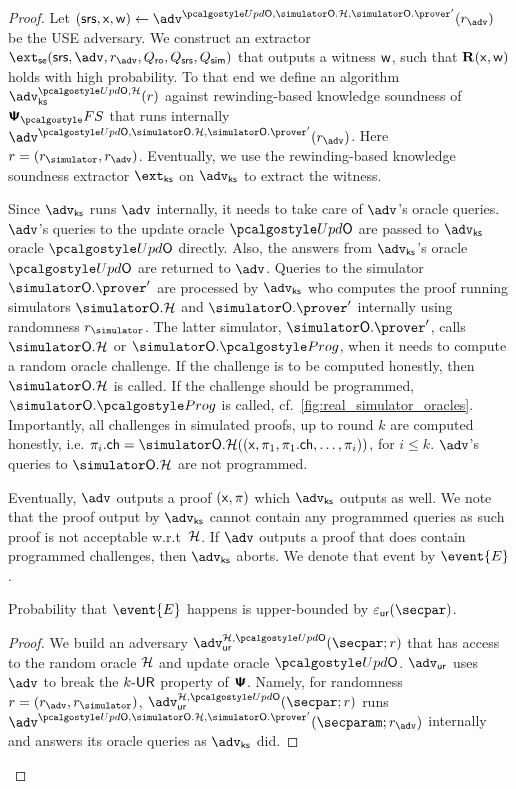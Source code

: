 \begin{proof}	
	Let $(\srs, \inp, \wit) \gets \advse^{\initU, \simOH, \simOP'}(r_{\advse})$ be the USE adversary. We construct an extractor $\extse (\srs, \advse, r_{\advse}, \Qro, \Qsrs, \Qsim)$ that outputs a witness $\mathsf{w}$, such that $\mathbf{R}(\mathsf{x}, \mathsf{w})$ holds with high probability. To that end we define an algorithm $\advcss^{\initU,\ro}(r)$ against rewinding-based knowledge soundness of $\psfs$ that runs internally $\advse^{\initU, \simOH, \simOP'}(r_{\advse})$. Here $r = (\rsim, r_{\advse})$. Eventually, we use the rewinding-based knowledge soundness extractor $\extcss$ on $\advcss$ to extract the witness.
	
	Since $\advcss$ runs $\advse$ internally, it needs to take care of $\advse$'s oracle queries.
	$\advse$'s queries to the update oracle $\initU$ are passed to $\advcss$ oracle $\initU$ directly. Also, the answers from $\advcss$'s oracle $\initU$ are returned to $\advse$.
	Queries to the simulator $\simOP'$ are processed by $\advcss$ who computes the proof running simulators $\simOH$ and $\simOP'$ internally using randomness $\rsim$. The latter simulator, $\simOP'$, calls $\simOH$ or $\simOHprog$, when it needs to compute a random oracle challenge. If the challenge is to be computed honestly, then $\simOH$ is called. If the challenge should be programmed, $\simOHprog$ is called, cf.~\cref{fig:real_simulator_oracles}. Importantly, all challenges in simulated proofs, up to round $k$ are computed honestly, i.e. $\zkproof_{i}.\ch = \simOH((\inp, \zkproof_1, \zkproof_1.\ch, \ldots, \zkproof_{i}))$, for $i \leq k$.
%
	$\advse$'s queries to $\simOH$ are not programmed.

	Eventually, $\advse$ outputs a proof $(\mathsf{x}, \pi)$ which $\advcss$ outputs as well. We note that the proof output by $\advcss$ cannot contain any programmed queries as such proof is not acceptable w.r.t~$\mathcal{H}$. If $\advse$ outputs a proof that does contain programmed challenges, then $\advcss$ aborts. We denote that event by $\event{E}$.
	
	\begin{lemma}
		Probability that $\event{E}$ happens is upper-bounded by $\epsur(\secpar)$. 
	\end{lemma}
	\begin{proof}
	We build an adversary $\advur^{\ro, \initU} (\secpar; r)$ that has access to the random oracle $\mathcal{H}$ and update oracle $\initU$. $\advur$ uses $\advse$ to break the ${k\text{-}\mathsf{UR}}$ property of $\bm{\mathsf{\Psi}}$. Namely, for randomness $r = (r_{\advse}, \rsim)$, $\advur^{\ro, \initU} (\secpar; r)$ runs $\advse^{\initU, \simOH, \simOP'}(\secparam; r_{\advse})$ internally and answers its oracle queries as $\advcss$ did.


\end{proof}
\end{proof}
